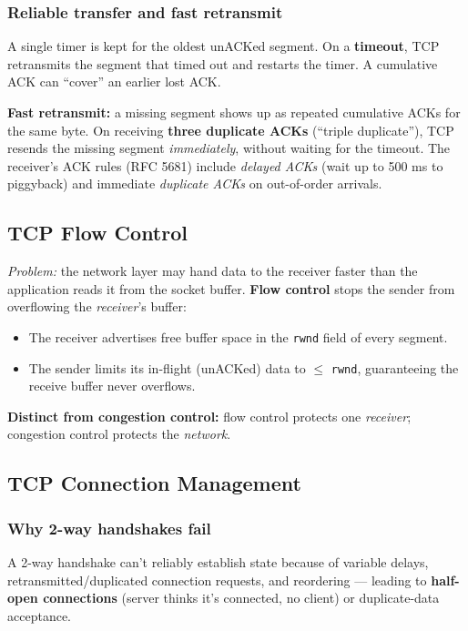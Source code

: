 \documentclass[hidelinks]{article}
\begin{document}
\subsubsection{Reliable transfer and fast retransmit}
A single timer is kept for the oldest unACKed segment. On a \textbf{timeout},
TCP retransmits the segment that timed out and restarts the timer. A
cumulative ACK can ``cover'' an earlier lost ACK.

\textbf{Fast retransmit:} a missing segment shows up as repeated cumulative
ACKs for the same byte. On receiving \textbf{three duplicate ACKs} (``triple
duplicate''), TCP resends the missing segment \emph{immediately}, without
waiting for the timeout. The receiver's ACK rules (RFC 5681) include
\emph{delayed ACKs} (wait up to 500 ms to piggyback) and immediate
\emph{duplicate ACKs} on out-of-order arrivals.

\subsection{TCP Flow Control}

\emph{Problem:} the network layer may hand data to the receiver faster than
the application reads it from the socket buffer. \textbf{Flow control} stops
the sender from overflowing the \emph{receiver}'s buffer:
\begin{itemize}
    \item The receiver advertises free buffer space in the \texttt{rwnd}
    field of every segment.
    \item The sender limits its in-flight (unACKed) data to $\leq$
    \texttt{rwnd}, guaranteeing the receive buffer never overflows.
\end{itemize}
\textbf{Distinct from congestion control:} flow control protects one
\emph{receiver}; congestion control protects the \emph{network}.

\subsection{TCP Connection Management}

\subsubsection{Why 2-way handshakes fail}
A 2-way handshake can't reliably establish state because of variable delays,
retransmitted/duplicated connection requests, and reordering --- leading to
\textbf{half-open connections} (server thinks it's connected, no client) or
duplicate-data acceptance.
\end{document}
